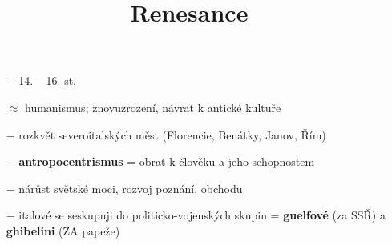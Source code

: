 \documentclass{article}
\title{\vspace{-2cm}Renesance\vspace{-1.7cm}}
\date{}
\author{}
\begin{document}
\maketitle

\begin{itemize}
    \vspace{-0.5em}
    \setlength\itemsep{0.15em}
    \item[$-$] 14. – 16. st.
    \item[$\approx$] humanismus; znovuzrození, návrat k antické kultuře
    \item[$-$] rozkvět severoitalských měst (Florencie, Benátky, Janov, Řím)
    \item[$-$] \textbf{antropocentrismus} = obrat k člověku a jeho schopnostem
    \item[$-$] nárůst světské moci, rozvoj poznání, obchodu
    \item[$-$] italové se seskupuji do politicko-vojenských skupin = \textbf{guelfové} (za SSŘ) a \textbf{ghibelini} (ZA papeže)
\end{itemize}
\end{document}
